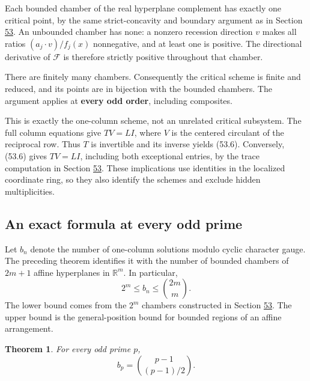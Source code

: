 \documentclass[11pt,reqno]{amsart}
\theoremstyle{plain}
\newtheorem{theorem}{Theorem}[section]
\begin{document}
Each bounded chamber of the real hyperplane complement has exactly one
critical point, by the same strict-concavity and boundary argument as
in Section \hyperref[sec:53]{53}. An unbounded chamber has none: a nonzero recession
direction \(v\) makes all ratios \((a_j\cdot v)/f_j(x)\) nonnegative,
and at least one is positive. The directional derivative of
\(\mathcal F\) is therefore strictly positive throughout that chamber.

There are finitely many chambers. Consequently the critical scheme is
finite and reduced, and its points are in bijection with the bounded
chambers. The argument applies at \textbf{every odd order}, including
composites.

This is exactly the one-column scheme, not an unrelated critical
subsystem. The full column equations give
\(TV=LI\), where \(V\) is the centered circulant of the reciprocal
row. Thus \(T\) is invertible and its inverse yields (53.6).
Conversely, (53.6) gives \(TV=LI\), including both exceptional
entries, by the trace computation in Section \hyperref[sec:53]{53}. These implications
use identities in the localized coordinate ring, so they also identify
the schemes and exclude hidden multiplicities.

\subsection{An exact formula at every odd prime}\label{sec:54.2}

Let \(b_n\) denote the number of one-column solutions modulo cyclic
character gauge. The preceding theorem identifies it with the number
of bounded chambers of \(2m+1\) affine hyperplanes in \(\mathbb R^m\).
In particular,
\begin{equation*}
 2^m\le b_n\le\binom{2m}{m}.
 \tag{54.4}
\end{equation*}
The lower bound comes from the \(2^m\) chambers constructed in
Section \hyperref[sec:53]{53}. The upper bound is the general-position bound for bounded
regions of an affine arrangement.

\begin{theorem}
For every odd prime \(p\),
\begin{equation*}
 \boxed{\displaystyle b_p=\binom{p-1}{(p-1)/2}.}\tag{54.5}
\end{equation*}
\end{theorem}
\end{document}
